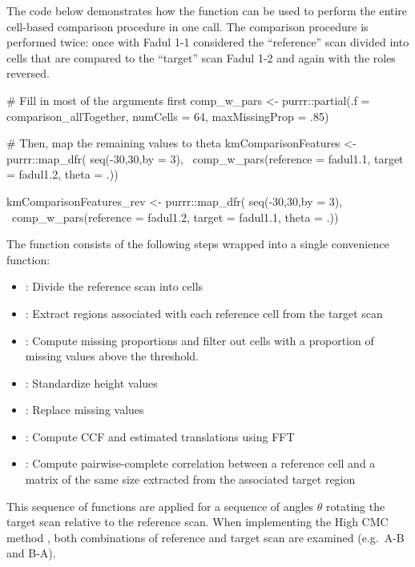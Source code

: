 The code below demonstrates how the 
function can be used to perform the entire cell-based comparison
procedure in one call. The comparison procedure is performed twice: once
with Fadul 1-1 considered the ``reference'' scan divided into cells that
are compared to the ``target'' scan Fadul 1-2 and again with the roles
reversed.

\begin{Schunk}
\begin{Sinput}
# Fill in most of the arguments first
comp_w_pars <- purrr::partial(.f = comparison_allTogether,
                               numCells = 64, maxMissingProp = .85)

# Then, map the remaining values to theta
kmComparisonFeatures <- purrr::map_dfr(
  seq(-30,30,by = 3),
  ~comp_w_pars(reference = fadul1.1, target = fadul1.2, theta = .))

kmComparisonFeatures_rev <- purrr::map_dfr(
  seq(-30,30,by = 3),
  ~comp_w_pars(reference = fadul1.2, target = fadul1.1, theta = .))
\end{Sinput}
\end{Schunk}

The  function consists of the following
steps wrapped into a single convenience function:

\begin{itemize}
\tightlist
\item
  : Divide the reference scan into cells
\item
  : Extract regions associated with
  each reference cell from the target scan
\item
  : Compute missing proportions and
  filter out cells with a proportion of missing values above the
  threshold.
\item
  : Standardize height values
\item
  : Replace missing values
\item
  : Compute CCF and estimated translations
  using FFT
\item
  : Compute pairwise-complete correlation between
  a reference cell and a matrix of the same size extracted from the
  associated target region
\end{itemize}

This sequence of functions are applied for a sequence of angles
\(\theta\) rotating the target scan relative to the reference scan. When
implementing the High CMC method \citep{tong_improved_2015}, both
combinations of reference and target scan are examined (e.g.~A-B and
B-A).

